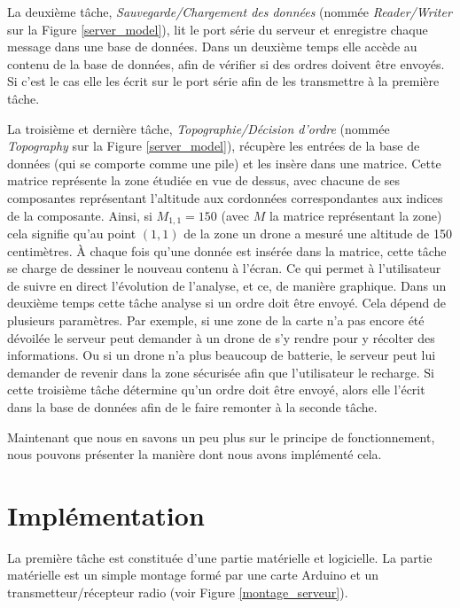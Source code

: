 \documentclass[a4paper,10pt]{report}
\begin{document}
	La deuxième tâche, \textit{Sauvegarde/Chargement des données} (nommée 
\textit{Reader/Writer} sur la Figure \ref{server_model}), lit le port série du 
serveur et enregistre chaque message dans une base de données. Dans un deuxième 
temps elle accède au contenu de la base de données, afin de vérifier si des 
ordres doivent être envoyés. Si c'est le cas elle les écrit sur le port série 
afin de les transmettre à la première tâche.

	La troisième et dernière tâche, \textit{Topographie/Décision d'ordre} 
(nommée \textit{Topography} sur la Figure \ref{server_model}), récupère les 
entrées de la base de données (qui se comporte comme une pile) et les insère 
dans une matrice. Cette matrice représente la zone étudiée en vue de dessus, 
avec chacune de ses composantes représentant l'altitude aux cordonnées 
correspondantes aux indices de la composante. Ainsi, si $M_{1, 1} = 150$ (avec 
$M$ la matrice représentant la zone) cela signifie qu'au point $(1, 1)$ de la 
zone un drone a mesuré une altitude de 150 centimètres. À chaque fois 
qu'une donnée est insérée dans la matrice, cette tâche se charge de dessiner 
le nouveau contenu à l'écran. Ce qui permet à l'utilisateur de suivre en 
direct l'évolution de l'analyse, et ce, de manière graphique. Dans un deuxième 
temps cette tâche analyse si un ordre doit être envoyé. Cela dépend de 
plusieurs paramètres. Par exemple, si une zone de la carte n'a pas encore été 
dévoilée le serveur peut demander à un drone de s'y rendre pour y récolter des 
informations. Ou si un drone n'a plus beaucoup de batterie, le serveur peut lui 
demander de revenir dans la zone sécurisée afin que l'utilisateur le recharge. 
Si cette troisième tâche détermine qu'un ordre doit être envoyé, alors elle 
l'écrit dans la base de données afin de le faire remonter à la seconde tâche.

	Maintenant que nous en savons un peu plus sur le principe de 
fonctionnement, nous pouvons présenter la manière dont nous avons implémenté 
cela.
    
    \section{Implémentation}
      La première tâche est constituée d'une partie matérielle et logicielle. 
La partie matérielle est un simple montage formé par une carte Arduino et un 
transmetteur/récepteur radio (voir Figure \ref{montage_serveur}).
\end{document}
